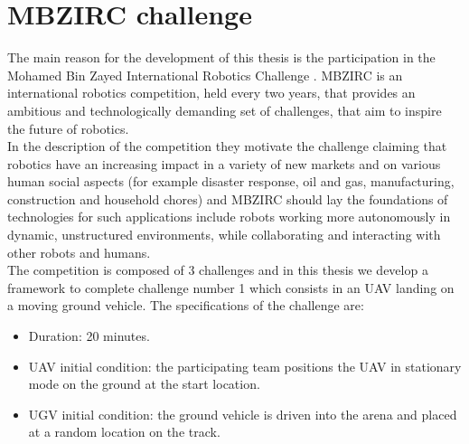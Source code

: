 



\section{MBZIRC challenge}\label{chap:thechallenge}
The main reason for the development of this thesis is the participation in the Mohamed Bin Zayed International Robotics Challenge \cite{challenge_description}. MBZIRC is an international robotics competition, held every two years, that provides an ambitious and technologically demanding set of challenges, that aim to inspire the future of robotics.\\ 
In the description of the competition they motivate the challenge claiming that robotics have an increasing impact in a variety of new markets and on various human social aspects (for example disaster response, oil and gas, manufacturing, construction and household chores) and MBZIRC should lay the foundations of technologies for such applications include robots working more autonomously in dynamic, unstructured environments, while collaborating and interacting with other robots and humans. \\

The competition is composed of 3 challenges and in this thesis we develop a framework to complete challenge number 1 which consists in an UAV landing on a moving ground vehicle. 
The specifications of the challenge are:
\begin{itemize}
\item Duration: 20 minutes.
\item UAV initial condition: the participating team positions the UAV in stationary mode on the ground at the start location.
\item UGV initial condition: the ground vehicle is driven into the arena and placed at a random location on the track.
\end{itemize}


